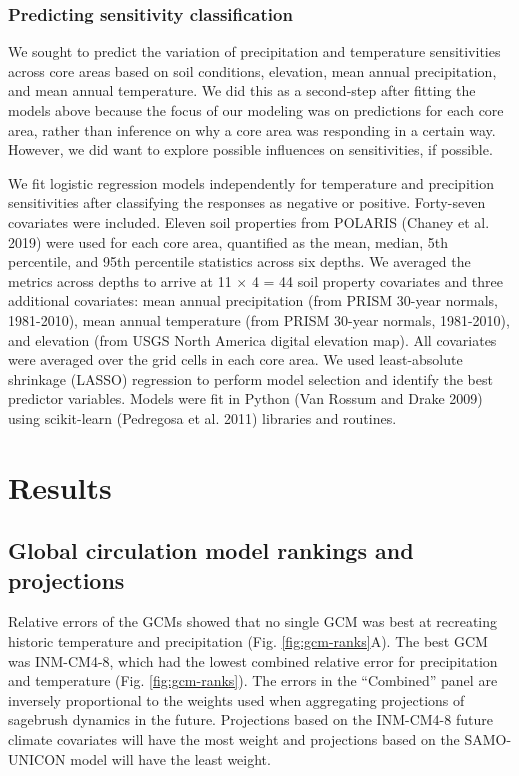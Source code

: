 \documentclass[
  12pt,
]{article}
\begin{document}
\hypertarget{predicting-sensitivity-classification}{%
\subsubsection{Predicting sensitivity classification}\label{predicting-sensitivity-classification}}

We sought to predict the variation of precipitation and temperature sensitivities across core areas based on soil conditions, elevation, mean annual precipitation, and mean annual temperature.
We did this as a second-step after fitting the models above because the focus of our modeling was on predictions for each core area, rather than inference on why a core area was responding in a certain way.
However, we did want to explore possible influences on sensitivities, if possible.

We fit logistic regression models independently for temperature and precipition sensitivities after classifying the responses as negative or positive.
Forty-seven covariates were included.
Eleven soil properties from POLARIS (Chaney et al. 2019) were used for each core area, quantified as the mean, median, 5th percentile, and 95th percentile statistics across six depths.
We averaged the metrics across depths to arrive at 11 \(\times\) 4 = 44 soil property covariates and three additional covariates: mean annual precipitation (from PRISM 30-year normals, 1981-2010), mean annual temperature (from PRISM 30-year normals, 1981-2010), and elevation (from USGS North America digital elevation map).
All covariates were averaged over the grid cells in each core area.
We used least-absolute shrinkage (LASSO) regression to perform model selection and identify the best predictor variables.
Models were fit in Python (Van Rossum and Drake 2009) using scikit-learn (Pedregosa et al. 2011) libraries and routines.

\hypertarget{results}{%
\section{Results}\label{results}}

\hypertarget{global-circulation-model-rankings-and-projections}{%
\subsection{Global circulation model rankings and projections}\label{global-circulation-model-rankings-and-projections}}

Relative errors of the GCMs showed that no single GCM was best at recreating historic temperature and precipitation (Fig. \ref{fig:gcm-ranks}A).
The best GCM was INM-CM4-8, which had the lowest combined relative error for precipitation and temperature (Fig. \ref{fig:gcm-ranks}).
The errors in the ``Combined'' panel are inversely proportional to the weights used when aggregating projections of sagebrush dynamics in the future.
Projections based on the INM-CM4-8 future climate covariates will have the most weight and projections based on the SAMO-UNICON model will have the least weight.
\end{document}
